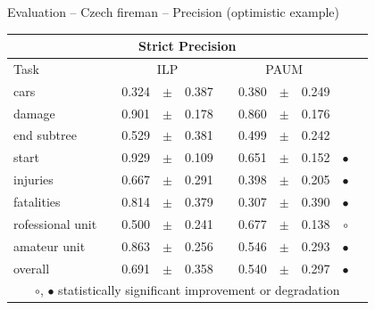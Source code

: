 \documentclass[xcolor=dvipsnames]{beamer}
\begin{document}
\begin{frame}{Evaluation -- Czech fireman -- Precision (optimistic example)}
\begin{tabular}
{lcrclcrcl@{\hspace{0.1cm}}cc}

\multicolumn{11}{c}{Strict Precision}\\
\hline
Task && \multicolumn{3}{c}{ILP}  && \multicolumn{3}{c}{PAUM} && \\
\hline
              cars &&      0.324 &  $\pm$  &       0.387 & &      0.380 &  $\pm$  &       0.249 &  \\
            damage &&      0.901 &  $\pm$  &       0.178 & &      0.860 &  $\pm$  &       0.176 &  \\
       end subtree &&      0.529 &  $\pm$  &       0.381 & &      0.499 &  $\pm$  &       0.242 &  \\
             start &&      0.929 &  $\pm$  &       0.109 & &      0.651 &  $\pm$  &       0.152 & $\bullet$ \\
          injuries &&      0.667 &  $\pm$  &       0.291 & &      0.398 &  $\pm$  &       0.205 & $\bullet$ \\
        fatalities &&      0.814 &  $\pm$  &       0.379 & &      0.307 &  $\pm$  &       0.390 & $\bullet$ \\
  rofessional unit &&      0.500 &  $\pm$  &       0.241 & &      0.677 &  $\pm$  &       0.138 & $\circ$ \\
      amateur unit &&      0.863 &  $\pm$  &       0.256 & &      0.546 &  $\pm$  &       0.293 & $\bullet$ \\
\hline
           overall &&      0.691 &  $\pm$  &       0.358 & &      0.540 &  $\pm$  &       0.297 & $\bullet$ \\
\hline
\multicolumn{11}{c}{$\circ$, $\bullet$ statistically significant improvement or degradation}\\
\end{tabular}
\end{frame}
\end{document}
